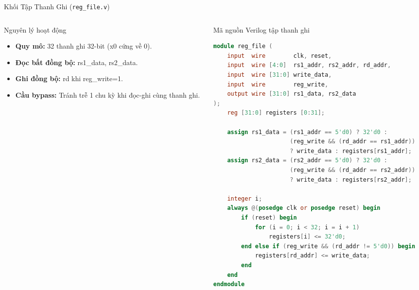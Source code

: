 \begin{frame}[fragile]{Khối Tập Thanh Ghi (\texttt{reg\_file.v})}
\begin{columns}
\begin{column}{0.46\textwidth}
            \vspace{0.15cm}
            \scriptsize
            \begin{block}{Nguyên lý hoạt động}
                \begin{itemize}
                    \item \textbf{Quy mô:} 32 thanh ghi 32-bit (x0 cứng về 0).
                    \item \textbf{Đọc bất đồng bộ:} rs1\_data, rs2\_data.
                    \item \textbf{Ghi đồng bộ:} rd khi reg\_write=1.
                    \item \textbf{Cầu bypass:} Tránh trễ 1 chu kỳ khi đọc-ghi cùng thanh ghi.
                \end{itemize}
            \end{block}
        \end{column}
        
        \begin{column}{0.52\textwidth}
            \begin{block}{Mã nguồn Verilog tập thanh ghi}
                \begin{lstlisting}[language=Verilog, basicstyle=\fontsize{6.0pt}{6.8pt}\selectfont\ttfamily, keywordstyle=\color{blue}, commentstyle=\color{gray}]
module reg_file (
    input  wire        clk, reset,
    input  wire [4:0]  rs1_addr, rs2_addr, rd_addr,
    input  wire [31:0] write_data,
    input  wire        reg_write,
    output wire [31:0] rs1_data, rs2_data
);
    reg [31:0] registers [0:31];

    assign rs1_data = (rs1_addr == 5'd0) ? 32'd0 :
                      (reg_write && (rd_addr == rs1_addr)) 
                      ? write_data : registers[rs1_addr];
    assign rs2_data = (rs2_addr == 5'd0) ? 32'd0 :
                      (reg_write && (rd_addr == rs2_addr)) 
                      ? write_data : registers[rs2_addr];

    integer i;
    always @(posedge clk or posedge reset) begin
        if (reset) begin
            for (i = 0; i < 32; i = i + 1)
                registers[i] <= 32'd0;
        end else if (reg_write && (rd_addr != 5'd0)) begin
            registers[rd_addr] <= write_data;
        end
    end
endmodule
                \end{lstlisting}
            \end{block}
        \end{column}
    \end{columns}
\end{frame}

